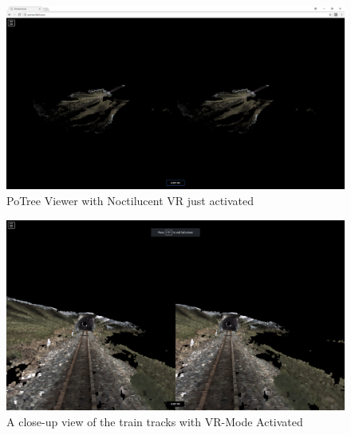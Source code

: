 \documentclass[draftclsnofoot,onecolumn]{IEEEtran}
\begin{document}
\begin{figure}[h]
	\centering
    \includegraphics[scale=.25]{NoctVR3}
	\caption{PoTree Viewer with Noctilucent VR just activated}
\end{figure}

\begin{figure}[h]
	\centering
    \includegraphics[scale=.25]{NoctVR4}
	\caption{A close-up view of the train tracks with VR-Mode Activated}
\end{figure}
\end{document}
